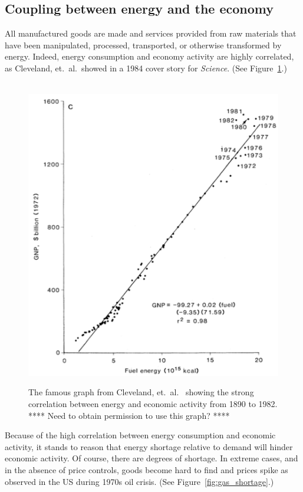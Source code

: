 \subsection{Coupling between energy and the economy}
\label{sec:energy-economy_coupling}

All manufactured goods are made and services provided
from raw materials that have been
manipulated, processed, transported, or otherwise transformed by energy.
Indeed, energy consumption and economy activity are highly correlated,
as Cleveland, et.\ al.\ showed in a 1984 cover story for \emph{Science}. 
(See Figure~\ref{fig:Cleveland1984}.)

\begin{figure}[!ht]
\centering\
\includegraphics[width=\linewidth]{Part_0/Chapter_Introduction/images/Cleveland1984.pdf}
\caption[Energy and economic activity]{The famous graph from Cleveland, et.\ al.\
\cite{Cleveland:1984aa} showing the strong correlation 
between energy and economic activity from 1890 to 1982.
**** Need to obtain permission to use this graph? ****}
\label{fig:Cleveland1984}
\end{figure}

Because of the high correlation between energy consumption and economic activity,
it stands to reason that energy shortage relative to demand will hinder economic activity.
Of course, there are degrees of shortage. 
In extreme cases, and in the absence of price controls,
goods become hard to find and prices spike
as observed in the US during 1970s oil crisis.
(See Figure~\ref{fig:gas_shortage}.)

